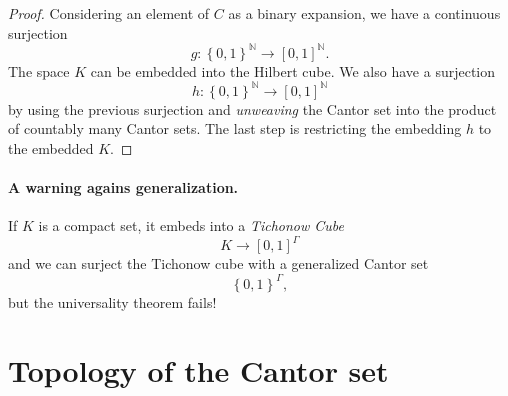 \begin{proof}
Considering an element of \( C \) as a binary expansion, we have a continuous surjection
\[ 
    g: \left\{ 0,1 \right\}^{ \mathbb{N} } \to [0,1]^{ \mathbb{N} }.
\]
The space \( K \) can be embedded into the Hilbert cube. We also have a surjection
\[ 
    h: \left\{ 0,1 \right\}^{ \mathbb{N} } \to [0,1]^{ \mathbb{N} }
\]
by using the previous surjection and \emph{unweaving} the Cantor set into the product of countably many Cantor sets. The last step is restricting the embedding \( h \) to the embedded \( K \).
\end{proof}

\paragraph{A warning agains generalization.} If \( K \) is a compact set, it embeds into a \emph{Tichonow Cube}
\[ 
    K \to [0,1]^\Gamma 
\]
and we can surject the Tichonow cube with a generalized Cantor set
\[ 
    \left\{ 0,1 \right\}^{\Gamma},
\]
but the universality theorem fails!

\section{Topology of the Cantor set}




